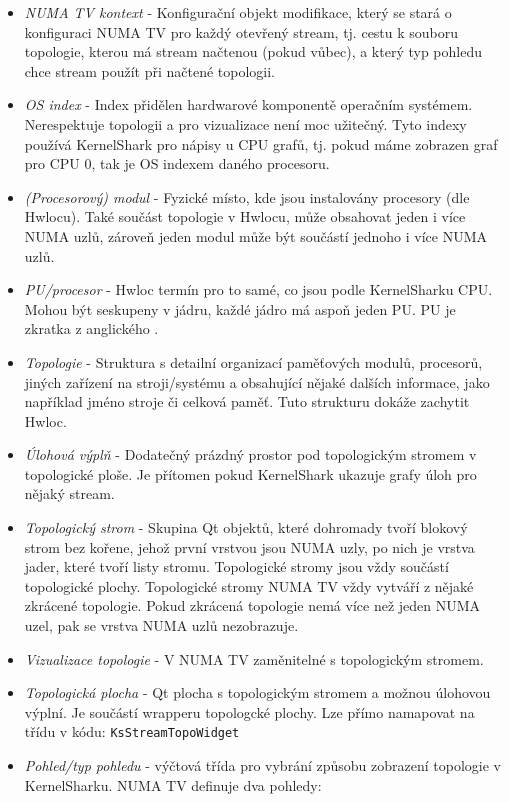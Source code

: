 \begin{itemize}
    \item \emph{NUMA TV kontext} - Konfigurační objekt modifikace, který se stará o konfiguraci NUMA TV pro každý otevřený stream, tj. cestu k souboru topologie, kterou má stream načtenou (pokud vůbec), a který typ pohledu chce stream použít při načtené topologii.
    \item \emph{OS index} - Index přidělen hardwarové komponentě operačním systémem. Nerespektuje topologii a pro vizualizace není moc užitečný. Tyto indexy používá KernelShark pro nápisy u CPU grafů, tj. pokud máme zobrazen graf pro CPU 0, tak  je OS indexem daného procesoru.
    \item \emph{(Procesorový) modul} - Fyzické místo, kde jsou instalovány procesory (dle Hwlocu). Také součást topologie v Hwlocu, může obsahovat jeden i více NUMA uzlů, zároveň jeden modul může být součástí jednoho i více NUMA uzlů.
    \item \emph{PU/procesor} - Hwloc termín pro to samé, co jsou podle KernelSharku CPU. Mohou být seskupeny v jádru, každé jádro má aspoň jeden PU. PU je zkratka z anglického .
    \item \emph{Topologie} - Struktura s detailní organizací paměťových modulů, procesorů, jiných zařízení na stroji/systému a obsahující nějaké dalších informace, jako například jméno stroje či celková paměť. Tuto strukturu dokáže zachytit Hwloc.
    \item \emph{Úlohová výplň} - Dodatečný prázdný prostor pod topologickým stromem v topologické ploše. Je přítomen pokud KernelShark ukazuje grafy úloh pro nějaký stream.
    \item \emph{Topologický strom} - Skupina Qt objektů, které dohromady tvoří blokový strom bez kořene, jehož první vrstvou jsou NUMA uzly, po nich je vrstva jader, které tvoří listy stromu. Topologické stromy jsou vždy součástí topologické plochy. Topologické stromy NUMA TV vždy vytváří z nějaké zkrácené topologie. Pokud zkrácená topologie nemá více než jeden NUMA uzel, pak se vrstva NUMA uzlů nezobrazuje.
    \item \emph{Vizualizace topologie} - V NUMA TV zaměnitelné s topologickým stromem.
    \item \emph{Topologická plocha} - Qt plocha s topologickým stromem a možnou úlohovou výplní. Je součástí wrapperu topologcké plochy. Lze přímo namapovat na třídu v kódu: \texttt{KsStreamTopoWidget}
    \item \emph{Pohled/typ pohledu} - výčtová třída pro vybrání způsobu zobrazení topologie v KernelSharku. NUMA TV definuje dva pohledy:

\end{itemize}
